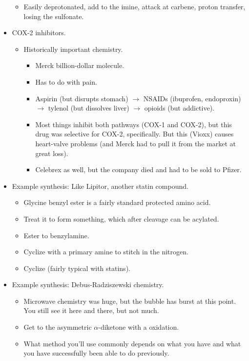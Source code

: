 \documentclass[../notes.tex]{subfiles}
\begin{document}
\begin{itemize}
\begin{itemize}
        \item Easily deprotonated, add to the imine, attack at carbene, proton transfer, losing the sulfonate.
    \end{itemize}
    \item COX-2 inhibitors.
    \begin{itemize}
        \item Historically important chemistry.
        \begin{itemize}
            \item Merck billion-dollar molecule.
            \item Has to do with pain.
            \item Aspirin (but disrupts stomach) $\to$ NSAIDs (ibuprofen, endoproxin) $\to$ tylenol (but dissolves liver) $\to$ opioids (but addictive).
            \item Most things inhibit both pathways (COX-1 and COX-2), but this drug was selective for COX-2, specifically. But this (Vioxx) causes heart-valve problems (and Merck had to pull it from the market at great loss).
            \item Celebrex as well, but the company died and had to be sold to Pfizer.
        \end{itemize}
    \end{itemize}
    \item Example synthesis: Like Lipitor, another statin compound.
    \begin{itemize}
        \item Glycine benzyl ester is a fairly standard protected amino acid.
        \item Treat it to form something, which after cleavage can be acylated.
        \item Ester to benzylamine.
        \item Cyclize with a primary amine to stitch in the nitrogen.
        \item Cyclize (fairly typical with statins).
    \end{itemize}
    \item Example synthesis: Debus-Radziszewski chemistry.
    \begin{itemize}
        \item Microwave chemistry was huge, but the bubble has burst at this point. You still see it here and there, but not much.
        \item Get to the asymmetric $\alpha$-diketone with a  oxidation.
        \item What method you'll use commonly depends on what you have and what you have successfully been able to do previously.

\end{itemize}
\end{itemize}
\end{document}
